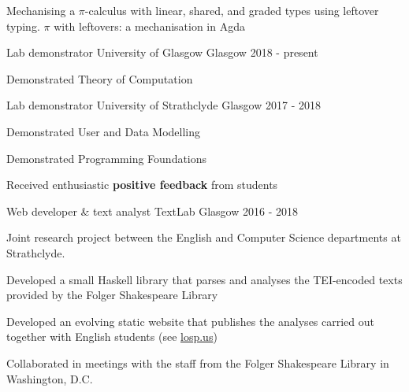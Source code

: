 \documentclass[11pt, a4paper]{awesome-cv}
\begin{document}
\begin{cventries}
  \cventry
  {Mechanising a $\pi$-calculus with linear, shared, and graded types using leftover typing.}
  {$\pi$ with leftovers: a mechanisation in Agda}
  {\href{https://arxiv.org/abs/2005.05902}{}}
  {\href{https://github.com/umazalakain/typing-with-leftovers}{}}
  {}
\end{cventries}


\begin{cventries}

    \cventry
      {Lab demonstrator} %
      {University of Glasgow} %
      {Glasgow} %
      {2018 - present} %
      {
        \begin{cvitems} %
          \item {Demonstrated Theory of Computation}
        \end{cvitems}
      }

    \cventry
      {Lab demonstrator} %
      {University of Strathclyde} %
      {Glasgow} %
      {2017 - 2018} %
      {
        \begin{cvitems} %
          \item {Demonstrated User and Data Modelling}
          \item {Demonstrated Programming Foundations}
          \item {Received enthusiastic \textbf{positive feedback} from students}
        \end{cvitems}
      }

    \cventry
      {Web developer \& text analyst} %
      {TextLab}
      {Glasgow} %
      {2016 - 2018} %
      {
        Joint research project between the English and Computer Science
        departments at Strathclyde.\vspace{1.1\baselineskip}
        \begin{cvitems} %
          \item {Developed a small Haskell library that parses and analyses the
              TEI-encoded texts provided by the Folger Shakespeare Library}
          \item {Developed an evolving static website that publishes the
              analyses carried out together with English students (see
                \url{losp.us})}
          \item {Collaborated in meetings with the staff from the Folger
              Shakespeare Library in Washington, D.C.}
        \end{cvitems}
      }


\end{cventries}
\end{document}
